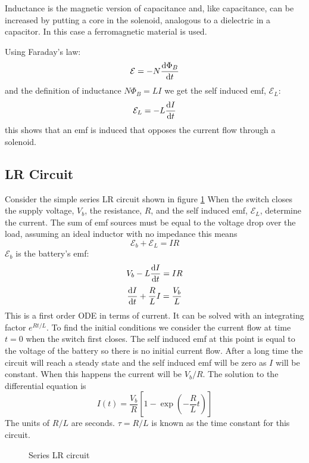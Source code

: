 \documentclass{article}
\newcommand{\emf}{\mathcal{E}}
\begin{document}
    Inductance is the magnetic version of capacitance and, like capacitance, can be increased by putting a core in the solenoid, analogous to a dielectric in a capacitor.
    In this case a ferromagnetic material is used.
    
    Using Faraday's law:
    \[\emf = -N\dv{\Phi_B}{t}\]
    and the definition of inductance \(N\Phi_B = LI\) we get the self induced emf, \(\emf_L\):
    \[\emf_L = -L\dv{I}{t}\]
    this shows that an emf is induced that opposes the current flow through a solenoid.
    
    \subsection{LR Circuit}
    Consider the simple series LR circuit shown in figure \ref{fig:LR circuit}
    When the switch closes the supply voltage, \(V_b\), the resistance, \(R\), and the self induced emf, \(\emf_L\), determine the current.
    The sum of emf sources must be equal to the voltage drop over the load, assuming an ideal inductor with no impedance this means
    \[\emf_b + \emf_L = IR\]
    \(\emf_b\) is the battery's emf:
    \[V_b - L\dv{I}{t} = IR\]
    \[\dv{I}{t} + \frac{R}{L}I = \frac{V_b}{L}\]
    This is a first order ODE in terms of current.
    It can be solved with an integrating factor \(e^{Rt/L}\).
    To find the initial conditions we consider the current flow at time \(t = 0\) when the switch first closes.
    The self induced emf at this point is equal to the voltage of the battery so there is no initial current flow.
    After a long time the circuit will reach a steady state and the self induced emf will be zero as \(I\) will be constant.
    When this happens the current will be \(V_b/R\).
    The solution to the differential equation is
    \[I(t) = \frac{V_b}{R}\left[1 - \exp\left(-\frac{R}{L}t\right)\right]\]
    The units of \(R/L\) are seconds.
    \(\tau = R/L\) is known as the time constant for this circuit.
    \begin{figure}[ht]
        \centering
        \caption{Series LR circuit}
        \label{fig:LR circuit}
    \end{figure}
    
\end{document}
